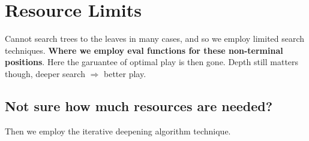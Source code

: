 \documentclass{article}
\begin{document}
\section{Resource Limits}
Cannot search trees to the leaves in many cases, and so we employ limited search techniques. \textbf{Where we employ eval functions for these non-terminal positions}. Here the garuantee of optimal play is then gone. Depth still matters though, deeper search $\Rightarrow$ better play.

\subsection{Not sure how much resources are needed?}
Then we employ the iterative deepening algorithm technique.
\end{document}
